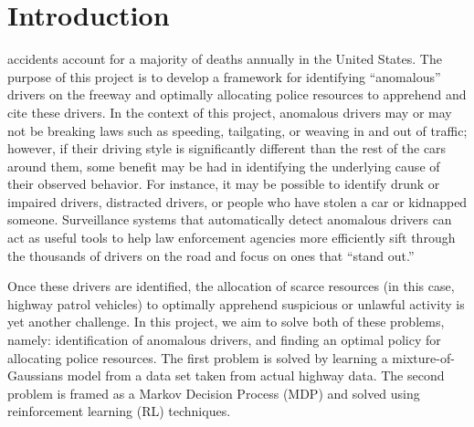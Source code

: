 \documentclass[10pt,journal]{IEEEtran}
\begin{document}
\section{Introduction}
 accidents account for a majority of deaths annually in the United States. The purpose of this project is to develop a framework for identifying ``anomalous'' drivers on the freeway and optimally allocating police resources to apprehend and cite these drivers. In the context of this project, anomalous drivers may or may not be breaking laws such as speeding, tailgating, or weaving in and out of traffic; however, if their driving style is significantly different than the rest of the cars around them, some benefit may be had in identifying the underlying cause of their observed behavior. For instance, it may be possible to identify drunk or impaired drivers, distracted drivers, or people who have stolen a car or kidnapped someone. Surveillance systems that automatically detect anomalous drivers can act as useful tools to help law enforcement agencies more efficiently sift through the thousands of drivers on the road and focus on ones that ``stand out.''

Once these drivers are identified, the allocation of scarce resources (in this case, highway patrol vehicles) to optimally apprehend suspicious or unlawful activity is yet another challenge. In this project, we aim to solve both of these problems, namely: identification of anomalous drivers, and finding an optimal policy for allocating police resources. The first problem is solved by learning a mixture-of-Gaussians model from a data set taken from actual highway data. The second problem is framed as a Markov Decision Process (MDP) and solved using reinforcement learning (RL) techniques. 
\end{document}
